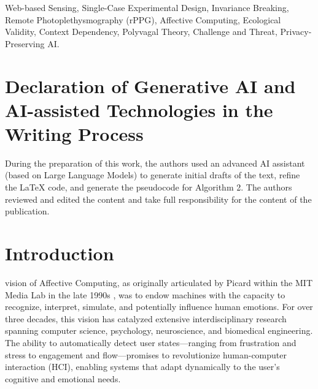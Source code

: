 \documentclass[journal]{IEEEtran}
\begin{document}
\begin{abstract}
\textbf{\textit{Conclusion}}: These findings provide empirical support for the "Safe Haven" hypothesis, suggesting that familiar, 
safe environments act as powerful moderators of the autonomic nervous system, effectively buffering the impact of cognitive stressors. 
We discuss the profound implications of this "Invariance Breaking" for the design of next-generation ubiquitous computing systems, 
arguing that future affective models must be dynamically parameterized by the user's environmental context 
to avoid catastrophic misinterpretation of physiological signals.
\end{abstract}

\begin{IEEEkeywords}
Web-based Sensing, Single-Case Experimental Design, Invariance Breaking, Remote Photoplethysmography (rPPG), 
Affective Computing, Ecological Validity, Context Dependency, Polyvagal Theory, Challenge and Threat, Privacy-Preserving AI.
\end{IEEEkeywords}

\section*{Declaration of Generative AI and AI-assisted Technologies in the Writing Process}
During the preparation of this work, the authors used an advanced AI assistant (based on Large Language Models) to generate initial drafts of the text, refine the LaTeX code, and generate the pseudocode for Algorithm 2. The authors reviewed and edited the content and take full responsibility for the content of the publication.

\section{Introduction}

 vision of Affective Computing, as originally articulated by Picard within the MIT Media Lab in the late 1990s \cite{picard_affective_computing}, 
was to endow machines with the capacity to recognize, interpret, simulate, and potentially influence human emotions. 
For over three decades, this vision has catalyzed extensive interdisciplinary research spanning computer science, psychology, 
neuroscience, and biomedical engineering. The ability to automatically detect user states—ranging from frustration and stress 
to engagement and flow—promises to revolutionize human-computer interaction (HCI), enabling systems that adapt dynamically 
to the user's cognitive and emotional needs.
\end{document}
